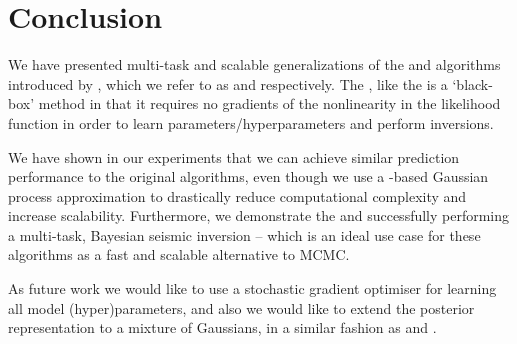 \section{Conclusion}

We have presented multi-task and scalable generalizations of the \egp and \ugp
algorithms introduced by \citet{steinberg-bonilla-nips-2014}, which we refer to
as \eks and \uks respectively. The \uks, like the \ugp is a `black-box' method
in that it requires no gradients of the nonlinearity in the likelihood
function in order to learn parameters/hyperparameters and perform inversions.

We have shown in our experiments that we can achieve similar prediction
performance to the original algorithms, even though we use a \rks-based
Gaussian process approximation to drastically reduce computational complexity
and increase scalability. Furthermore, we demonstrate the \eks and \uks
successfully performing a multi-task, Bayesian seismic inversion -- which is
an ideal use case for these algorithms as a fast and scalable alternative to
MCMC.

As future work we would like to use a stochastic gradient optimiser for
learning all model (hyper)parameters, and also we would like to extend the
posterior representation to a mixture of Gaussians, in a similar fashion as
\citet{nguyen-bonilla-uai-2014} and \citet{gershman-et-al-icml-12}.
